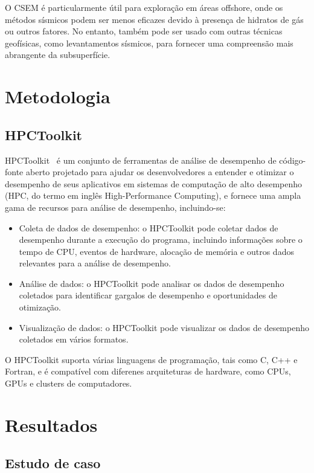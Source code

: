 \documentclass[12pt]{article}
\begin{document}
O CSEM é particularmente útil para exploração em áreas offshore, onde os métodos sísmicos podem ser menos eficazes devido à presença de hidratos de gás ou outros fatores. No entanto, também pode ser usado com outras técnicas geofísicas, como levantamentos sísmicos, para fornecer uma compreensão mais abrangente da subsuperfície.

\section{Metodologia}

\subsection{HPCToolkit}
HPCToolkit~\cite{hpctoolkit2010} é um conjunto de ferramentas de análise de desempenho de código-fonte aberto projetado para ajudar os desenvolvedores a entender e otimizar o desempenho de seus aplicativos em sistemas de computação de alto desempenho (HPC, do termo em inglês High-Performance Computing), e fornece uma ampla gama de recursos para análise de desempenho, incluindo-se:
\begin{itemize}
 \item Coleta de dados de desempenho: o HPCToolkit pode coletar dados de desempenho durante a execução do programa, incluindo informações sobre o tempo de CPU, eventos de hardware, alocação de memória e outros dados relevantes para a análise de desempenho.
  \item Análise de dados: o HPCToolkit pode analisar os dados de desempenho coletados para identificar gargalos de desempenho e oportunidades de otimização.
 \item Visualização de dados: o HPCToolkit pode visualizar os dados de desempenho coletados em vários formatos.
\end{itemize}
O HPCToolkit suporta várias linguagens de programação, tais como C, C++ e Fortran, e é compatível com diferenes arquiteturas de hardware, como CPUs, GPUs e clusters de computadores.

\section{Resultados}

\subsection{Estudo de caso}
\end{document}
